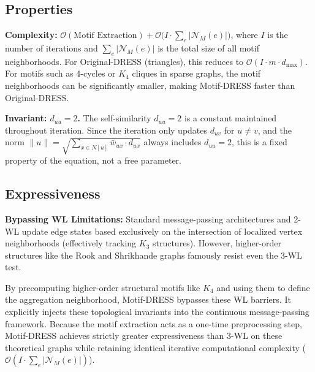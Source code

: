 \documentclass[11pt,a4paper]{article}
\begin{document}
\subsection{Properties}

\textbf{Complexity:} $\mathcal{O}(\text{Motif Extraction}) + \mathcal{O}\!\bigl(I \cdot \sum_{e} |\mathcal{N}_M(e)|\bigr)$, where $I$ is the number of iterations and $\sum_e |\mathcal{N}_M(e)|$ is the total size of all motif neighborhoods. For Original-DRESS (triangles), this reduces to $\mathcal{O}(I \cdot m \cdot d_{\max})$. For motifs such as 4-cycles or $K_4$ cliques in sparse graphs, the motif neighborhoods can be significantly smaller, making Motif-DRESS faster than Original-DRESS.

\textbf{Invariant: $d_{uu} = 2$.} The self-similarity $d_{uu} = 2$ is a constant maintained throughout iteration. Since the iteration only updates $d_{uv}$ for $u \ne v$, and the norm $\|u\| = \sqrt{\sum_{x \in N[u]} \bar{w}_{ux} \cdot d_{ux}}$ always includes $d_{uu} = 2$, this is a fixed property of the equation, not a free parameter.

\subsection{Expressiveness}

\textbf{Bypassing WL Limitations:} Standard message-passing architectures and 2-WL update edge states based exclusively on the intersection of localized vertex neighborhoods (effectively tracking $K_3$ structures). However, higher-order structures like the Rook and Shrikhande graphs famously resist even the 3-WL test. 

By precomputing higher-order structural motifs like $K_4$ and using them to define the aggregation neighborhood, Motif-DRESS bypasses these WL barriers. It explicitly injects these topological invariants into the continuous message-passing framework. Because the motif extraction acts as a one-time preprocessing step, Motif-DRESS achieves strictly greater expressiveness than 3-WL on these theoretical graphs while retaining identical iterative computational complexity ($\mathcal{O}(I \cdot \sum_e |\mathcal{N}_M(e)|)$).
\end{document}
